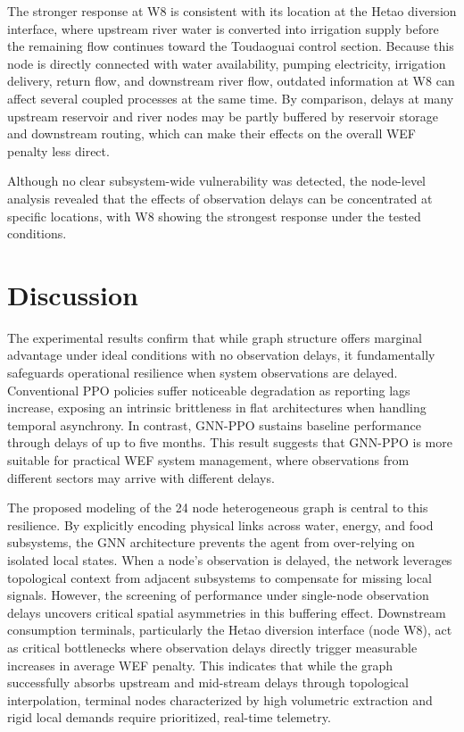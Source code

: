 \documentclass [a4paper,fleqn] {cas-dc}
\begin{document}
The stronger response at W8 is consistent with its location at the Hetao diversion interface, where upstream river water is converted into irrigation supply before the remaining flow continues toward the Toudaoguai control section. Because this node is directly connected with water availability, pumping electricity, irrigation delivery, return flow, and downstream river flow, outdated information at W8 can affect several coupled processes at the same time. By comparison, delays at many upstream reservoir and river nodes may be partly buffered by reservoir storage and downstream routing, which can make their effects on the overall WEF penalty less direct.

Although no clear subsystem-wide vulnerability was detected, the node-level analysis revealed that the effects of observation delays can be concentrated at specific locations, with W8 showing the strongest response under the tested conditions.



\section{Discussion} \label{sec5}

The experimental results confirm that while graph structure offers marginal advantage under ideal conditions with no observation delays, it fundamentally safeguards operational resilience when system observations are delayed. Conventional PPO policies suffer noticeable degradation as reporting lags increase, exposing an intrinsic brittleness in flat architectures when handling temporal asynchrony. In contrast, GNN-PPO sustains baseline performance through delays of up to five months. This result suggests that GNN-PPO is more suitable for practical WEF system management, where observations from different sectors may arrive with different delays.

The proposed modeling of the 24 node heterogeneous graph is central to this resilience. By explicitly encoding physical links across water, energy, and food subsystems, the GNN architecture prevents the agent from over-relying on isolated local states. When a node's observation is delayed, the network leverages topological context from adjacent subsystems to compensate for missing local signals. However, the screening of performance under single-node observation delays uncovers critical spatial asymmetries in this buffering effect. Downstream consumption terminals, particularly the Hetao diversion interface (node W8), act as critical bottlenecks where observation delays directly trigger measurable increases in average WEF penalty. This indicates that while the graph successfully absorbs upstream and mid-stream delays through topological interpolation, terminal nodes characterized by high volumetric extraction and rigid local demands require prioritized, real-time telemetry.  
\end{document}
